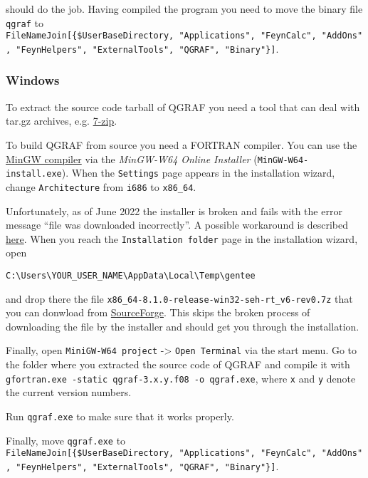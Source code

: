 \documentclass[../FeynHelpersManual.tex]{subfiles}
\begin{document}
should do the job. Having compiled the program you need to move the
binary file \texttt{qgraf} to
\texttt{FileNameJoin[\allowbreak{}\{\allowbreak{}\$UserBaseDirectory,\ \allowbreak{}"Applications",\ \allowbreak{}"FeynCalc",\ \allowbreak{}"AddOns",\ \allowbreak{}"FeynHelpers",\ \allowbreak{}"ExternalTools",\ \allowbreak{}"QGRAF",\ \allowbreak{}"Binary"\}]}.

\hypertarget{windows-5}{%
\subsubsection{Windows}\label{windows-5}}

To extract the source code tarball of QGRAF you need a tool that can
deal with tar.gz archives, e.g. \href{https://www.7-zip.org/}{7-zip}.

To build QGRAF from source you need a FORTRAN compiler. You can use the
\href{https://sourceforge.net/projects/mingw-w64/files/mingw-w64}{MinGW
compiler} via the \emph{MinGW-W64 Online Installer}
(\texttt{MinGW-W64-install.exe}). When the \texttt{Settings} page
appears in the installation wizard, change \texttt{Architecture} from
\texttt{i686} to \texttt{x86_64}.

Unfortunately, as of June 2022 the installer is broken and fails with
the error message ``file was downloaded incorrectly''. A possible
workaround is described
\href{https://sourceforge.net/p/mingw-w64/support-requests/125/}{here}.
When you reach the \texttt{Installation folder} page in the installation
wizard, open

\begin{verbatim}
C:\Users\YOUR_USER_NAME\AppData\Local\Temp\gentee
\end{verbatim}

and drop there the file
\texttt{x86_64-8.1.0-release-win32-seh-rt_v6-rev0.7z} that you can
donwload from
\href{https://sourceforge.net/projects/mingw-w64/files/Toolchains\%20targetting\%20Win64/Personal\%20Builds/mingw-builds/8.1.0/threads-posix/seh/x86_64-8.1.0-release-posix-seh-rt_v6-rev0.7z}{SourceForge}.
This skips the broken process of downloading the file by the installer
and should get you through the installation.

Finally, open \texttt{MiniGW-W64 project} -\textgreater{}
\texttt{Open Terminal} via the start menu. Go to the folder where you
extracted the source code of QGRAF and compile it with
\texttt{gfortran.exe -static qgraf-3.x.y.f08 -o qgraf.exe}, where
\texttt{x} and \texttt{y} denote the current version numbers.

Run \texttt{qgraf.exe} to make sure that it works properly.

Finally, move \texttt{qgraf.exe} to
\texttt{FileNameJoin[\allowbreak{}\{\allowbreak{}\$UserBaseDirectory,\ \allowbreak{}"Applications",\ \allowbreak{}"FeynCalc",\ \allowbreak{}"AddOns",\ \allowbreak{}"FeynHelpers",\ \allowbreak{}"ExternalTools",\ \allowbreak{}"QGRAF",\ \allowbreak{}"Binary"\}]}.
\end{document}
